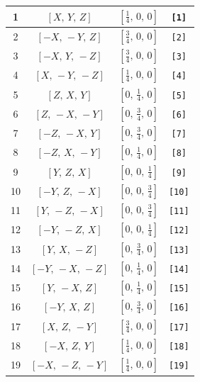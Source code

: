 \documentclass[fleqn,8pt]{jsarticle}
\begin{document}
\begin{longtable}{cccc}
1 & $\left[ X,\, Y,\, Z \right]$ & $\left[ \frac{1}{4},\, 0,\, 0 \right]$ & {\tt [1]} \\ \hline
2 & $\left[ - X,\, - Y,\, Z \right]$ & $\left[ \frac{3}{4},\, 0,\, 0 \right]$ & {\tt [2]} \\ \hline
3 & $\left[ - X,\, Y,\, - Z \right]$ & $\left[ \frac{3}{4},\, 0,\, 0 \right]$ & {\tt [3]} \\ \hline
4 & $\left[ X,\, - Y,\, - Z \right]$ & $\left[ \frac{1}{4},\, 0,\, 0 \right]$ & {\tt [4]} \\ \hline
5 & $\left[ Z,\, X,\, Y \right]$ & $\left[ 0,\, \frac{1}{4},\, 0 \right]$ & {\tt [5]} \\ \hline
6 & $\left[ Z,\, - X,\, - Y \right]$ & $\left[ 0,\, \frac{3}{4},\, 0 \right]$ & {\tt [6]} \\ \hline
7 & $\left[ - Z,\, - X,\, Y \right]$ & $\left[ 0,\, \frac{3}{4},\, 0 \right]$ & {\tt [7]} \\ \hline
8 & $\left[ - Z,\, X,\, - Y \right]$ & $\left[ 0,\, \frac{1}{4},\, 0 \right]$ & {\tt [8]} \\ \hline
9 & $\left[ Y,\, Z,\, X \right]$ & $\left[ 0,\, 0,\, \frac{1}{4} \right]$ & {\tt [9]} \\ \hline
10 & $\left[ - Y,\, Z,\, - X \right]$ & $\left[ 0,\, 0,\, \frac{3}{4} \right]$ & {\tt [10]} \\ \hline
11 & $\left[ Y,\, - Z,\, - X \right]$ & $\left[ 0,\, 0,\, \frac{3}{4} \right]$ & {\tt [11]} \\ \hline
12 & $\left[ - Y,\, - Z,\, X \right]$ & $\left[ 0,\, 0,\, \frac{1}{4} \right]$ & {\tt [12]} \\ \hline
13 & $\left[ Y,\, X,\, - Z \right]$ & $\left[ 0,\, \frac{3}{4},\, 0 \right]$ & {\tt [13]} \\ \hline
14 & $\left[ - Y,\, - X,\, - Z \right]$ & $\left[ 0,\, \frac{1}{4},\, 0 \right]$ & {\tt [14]} \\ \hline
15 & $\left[ Y,\, - X,\, Z \right]$ & $\left[ 0,\, \frac{1}{4},\, 0 \right]$ & {\tt [15]} \\ \hline
16 & $\left[ - Y,\, X,\, Z \right]$ & $\left[ 0,\, \frac{3}{4},\, 0 \right]$ & {\tt [16]} \\ \hline
17 & $\left[ X,\, Z,\, - Y \right]$ & $\left[ \frac{3}{4},\, 0,\, 0 \right]$ & {\tt [17]} \\ \hline
18 & $\left[ - X,\, Z,\, Y \right]$ & $\left[ \frac{1}{4},\, 0,\, 0 \right]$ & {\tt [18]} \\ \hline
19 & $\left[ - X,\, - Z,\, - Y \right]$ & $\left[ \frac{1}{4},\, 0,\, 0 \right]$ & {\tt [19]} \\ \hline

\end{longtable}
\end{document}
